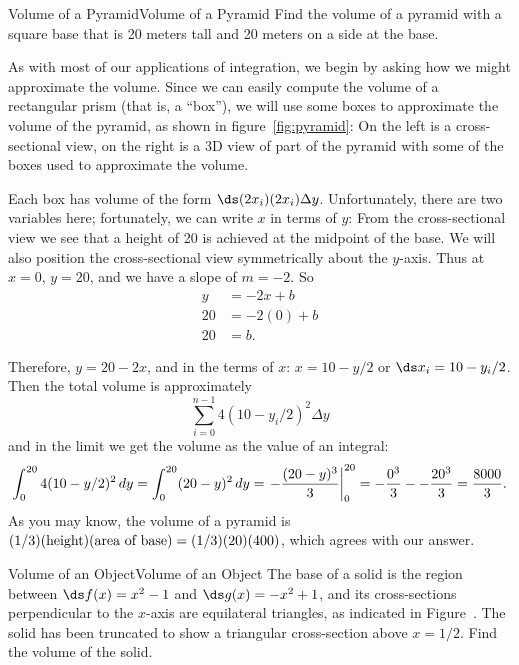 \begin{example}{Volume of a Pyramid}{Volume of a Pyramid}\label{Volume of a Pyramid}
Find the volume of a pyramid with a square base that is 20 meters tall
and 20 meters on a side at the base. 
\end{example}

\begin{solution}
As with most of our applications
of integration, we begin by asking how we might approximate the
volume. Since we can easily compute the volume of a rectangular prism
(that is, a ``box''), we will use some boxes to approximate the volume of
the pyramid, as shown in figure~\ref{fig:pyramid}: On the left is a
cross-sectional view, on the right is a 3D view of part of the pyramid
with some of the boxes used to approximate the volume.

Each box has volume of the form $\ds (2x_i)(2x_i)\Delta y$. Unfortunately,
there are two variables here; fortunately, we can write $x$ in terms
of $y$: From the cross-sectional view we see that a height of 20 is achieved at the midpoint of the base. We will also position the cross-sectional view symmetrically about the $y$-axis. Thus at $x=0$, $y=20$, and we have a slope of $m=-2$. So
\begin{align*}
y&=-2x+b	\\
20&=-2(0)+b	\\
20&=b.
\end{align*}

Therefore, $y=20-2x$, and in the terms of $x$: $x=10-y/2$ or $\ds x_i=10-y_i/2$. Then the total volume is
approximately
$$\sum_{i=0}^{n-1} 4(10-y_i/2)^2\Delta y$$
and in the limit we get the volume as the value of an integral:
$$
  \int_0^{20} 4(10-y/2)^2\,dy=\int_0^{20} (20-y)^2\,dy=
  \left.-{(20-y)^3\over3}\right|_0^{20}=
  -{0^3\over3}--{20^3\over3}={8000\over3}.
$$
As you may know, the volume of a pyramid is 
$(1/3)(\hbox{height})(\hbox{area of base})=(1/3)(20)(400)$, which
agrees with our answer.
\end{solution}

\begin{example}{Volume of an Object}{Volume of an Object}\label{Volume of an Object}
The base of a solid is the region between $\ds f(x)=x^2-1$ and
$\ds g(x)=-x^2+1$, and its cross-sections perpendicular to the $x$-axis 
are equilateral triangles, as indicated in
Figure~.
The solid has been truncated to show a triangular
cross-section above $x=1/2$.
Find the volume of the solid.
\end{example}

